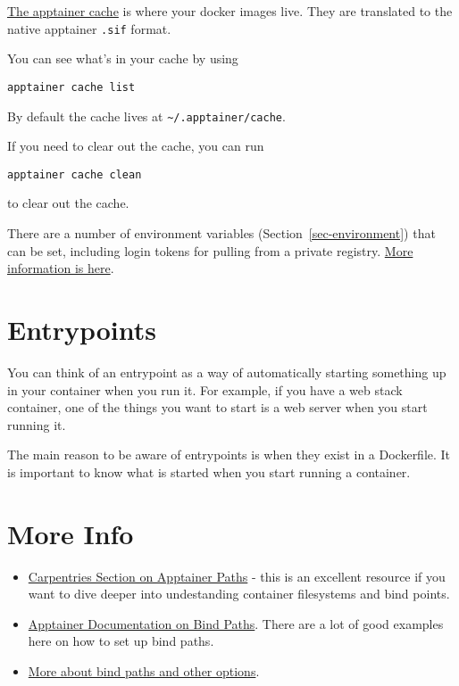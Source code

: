 \documentclass[
  letterpaper,
  DIV=11,
  numbers=noendperiod]{scrreprt}
\providecommand{\tightlist}{%
  \setlength{\itemsep}{0pt}\setlength{\parskip}{0pt}}
\begin{document}
\href{https://apptainer.org/docs/user/1.0/build_env.html}{The apptainer
cache} is where your docker images live. They are translated to the
native apptainer \texttt{.sif} format.

You can see what's in your cache by using

\begin{verbatim}
apptainer cache list
\end{verbatim}

By default the cache lives at
\texttt{\textasciitilde{}/.apptainer/cache}.

If you need to clear out the cache, you can run

\begin{verbatim}
apptainer cache clean
\end{verbatim}

to clear out the cache.

There are a number of environment variables
(Section~\ref{sec-environment}) that can be set, including login tokens
for pulling from a private registry.
\href{https://apptainer.org/docs/user/1.0/build_env.html\#environment-variables}{More
information is here}.

\section{Entrypoints}\label{entrypoints}

You can think of an entrypoint as a way of automatically starting
something up in your container when you run it. For example, if you have
a web stack container, one of the things you want to start is a web
server when you start running it.

The main reason to be aware of entrypoints is when they exist in a
Dockerfile. It is important to know what is started when you start
running a container.

\section{More Info}\label{more-info}

\begin{itemize}
\tightlist
\item
  \href{https://hsf-training.github.io/hsf-training-singularity-webpage/07-file-sharing/index.html}{Carpentries
  Section on Apptainer Paths} - this is an excellent resource if you
  want to dive deeper into undestanding container filesystems and bind
  points.
\item
  \href{https://apptainer.org/docs/user/main/bind_paths_and_mounts.html\#bind-examples}{Apptainer
  Documentation on Bind Paths}. There are a lot of good examples here on
  how to set up bind paths.
\item
  \href{https://apptainer.org/docs/user/main/bind_paths_and_mounts.html}{More
  about bind paths and other options}.
\end{itemize}
\end{document}
